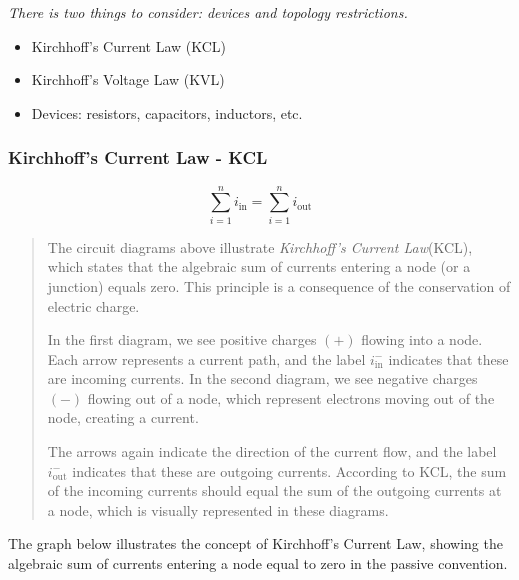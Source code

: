
\emph{There is two things to consider: devices and topology restrictions.}

\begin{itemize}
  \item{Kirchhoff's Current Law (KCL)}
  \item{Kirchhoff's Voltage Law (KVL)}
  \item{Devices: resistors, capacitors, inductors, etc.}
\end{itemize}

\subsubsection{Kirchhoff's Current Law - KCL}


\begin{equation}
  \sum_{i=1}^{n} i_{\text{in}} = \sum_{i=1}^{n} i_{\text{out}}
\end{equation}


\begin{quote}

  The circuit diagrams above illustrate \emph{Kirchhoff's Current Law}(KCL), 
which states that the algebraic sum of currents entering a node (or a junction) equals zero. 
This principle is a consequence of the conservation of electric charge. 

In the first diagram, we see positive charges $(+)$ flowing into a node. Each arrow represents a current path, 
and the label $i_{\text{in}}^-$ indicates that these are incoming currents. In the second diagram, we see negative charges $(-)$ flowing out of a node, 
which represent electrons moving out of the node, creating a current. 

The arrows again indicate the direction of the current flow, and the label $i_{\text{out}}^-$ indicates that these are outgoing currents. According to KCL, 
the sum of the incoming currents should equal the sum of the outgoing currents at a node, which is visually represented in these diagrams.

\end{quote}

The graph below illustrates the concept of Kirchhoff's Current Law, showing the algebraic sum of currents entering a node equal to zero in the passive convention.

